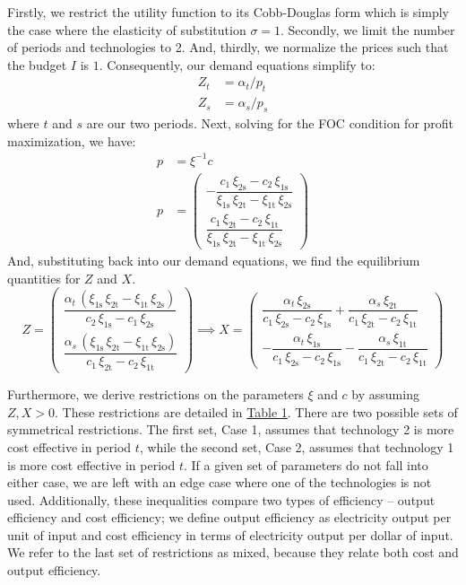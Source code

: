 \documentclass[11pt,a4paper]{extarticle}
\begin{document}
Firstly, we restrict the utility function to its Cobb-Douglas form which is simply the case where the elasticity of substitution $\sigma = 1$. Secondly, we limit the number of periods and technologies to 2. And, thirdly, we normalize the prices such that the budget $I$ is $1$. Consequently, our demand equations simplify to:
\begin{align}
Z_t &= \alpha_t / p_t \\
Z_s &= \alpha_s / p_s
\end{align}
where $t$ and $s$ are our two periods. Next, solving for the FOC condition for profit maximization, we have:
\begin{align*}
p &=  \xi^{-1} c \\
p &= \begin{pmatrix}
-\dfrac{c_{1}\,\xi _{\mathrm{2s}}-c_{2}\,\xi _{\mathrm{1s}}}{\xi _{\mathrm{1s}}\,\xi _{\mathrm{2t}}-\xi _{\mathrm{1t}}\,\xi _{\mathrm{2s}}}  \\[2ex]
\dfrac{c_{1}\,\xi _{\mathrm{2t}}-c_{2}\,\xi _{\mathrm{1t}}}{\xi _{\mathrm{1s}}\,\xi _{\mathrm{2t}}-\xi _{\mathrm{1t}}\,\xi _{\mathrm{2s}}} 
\end{pmatrix} 
\end{align*}
And, substituting back into our demand equations, we find the equilibrium quantities for $Z$ and $X$. 
$$
Z = \begin{pmatrix}
\dfrac{\alpha _{t}\,\left(\xi _{\mathrm{1s}}\,\xi _{\mathrm{2t}}-\xi _{\mathrm{1t}}\,\xi _{\mathrm{2s}}\right)}{c_{2}\,\xi _{\mathrm{1s}} - c_{1}\,\xi _{\mathrm{2s}}} \\[2ex]
\dfrac{\alpha _{s}\,\left(\xi _{\mathrm{1s}}\,\xi _{\mathrm{2t}}-\xi _{\mathrm{1t}}\,\xi _{\mathrm{2s}}\right)}{c_{1}\,\xi _{\mathrm{2t}}-c_{2}\,\xi _{\mathrm{1t}}} 
\end{pmatrix}
\implies 
X = \begin{pmatrix}
\dfrac{\alpha _{t}\,\xi _{\mathrm{2s}}}{c_{1}\,\xi _{\mathrm{2s}}-c_{2}\,\xi _{\mathrm{1s}}}+\dfrac{\alpha _{s}\,\xi _{\mathrm{2t}}}{c_{1}\,\xi _{\mathrm{2t}}-c_{2}\,\xi _{\mathrm{1t}}} \\[2ex] 
-\dfrac{\alpha _{t}\,\xi _{\mathrm{1s}}}{c_{1}\,\xi _{\mathrm{2s}}-c_{2}\,\xi _{\mathrm{1s}}}-\dfrac{\alpha _{s}\,\xi _{\mathrm{1t}}}{c_{1}\,\xi _{\mathrm{2t}}-c_{2}\,\xi _{\mathrm{1t}}}
\end{pmatrix}
$$

Furthermore, we derive restrictions on the parameters $\xi$ and $c$ by assuming $Z, X > 0$. These restrictions are detailed in \hyperref[tab:paramrest]{Table 1}. There are two possible sets of symmetrical restrictions. The first set, Case 1, assumes that technology 2 is more cost effective in period $t$, while the second set, Case 2, assumes that technology 1 is more cost effective in period $t$. If a given set of parameters do not fall into either case, we are left with an edge case where one of the technologies is not used. Additionally, these inequalities compare two types of efficiency -- output efficiency and cost efficiency; we define output efficiency as electricity output per unit of input and cost efficiency in terms of electricity output per dollar of input. We refer to the last set of restrictions as mixed, because they relate both cost and output efficiency. 
\end{document}
